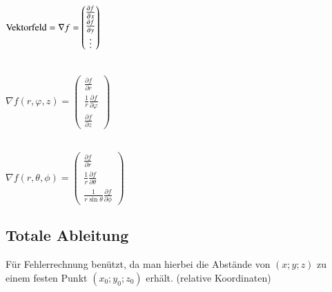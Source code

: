 \begin{center}
\begin{minipage}{0.35\columnwidth}
    \\
    $\text{Vektorfeld} = \displaystyle\tikznode{grad}{\nabla} f = 
    \begin{pmatrix}
        \frac{\partial f^{\mathstrut}}{\partial^{\mathstrut} x}\\
        \frac{\partial f^{\mathstrut}}{\partial^{\mathstrut} y}\\
        \vdots      %
    \end{pmatrix}$
\end{minipage}
\begin{minipage}{0.3\columnwidth}
    \\

    $\nabla f(r, \varphi, z) = \begin{pmatrix}
        \frac{\partial f}{\partial r} \\
        \frac{1}{r}\frac{\partial f}{\partial \varphi} \\
        \frac{\partial f}{\partial z}
    \end{pmatrix}$
\end{minipage}
\begin{minipage}{0.3\columnwidth}
    \\

    $\nabla f(r, \theta, \phi) = \begin{pmatrix}
        \frac{\partial f}{\partial r} \\
        \frac{1}{r} \frac{\partial f}{\partial \theta} \\
        \frac{1}{r \sin\theta} \frac{\partial f}{\partial \phi}
    \end{pmatrix}$
\end{minipage}
\end{center}




\subsection{Totale Ableitung}
Für Fehlerrechnung benützt, da man hierbei die Abstände von $(x; y; z)$ 
zu einem festen Punkt $(x_{0}; y_{0}; z_{0})$ erhält. (relative Koordinaten)


